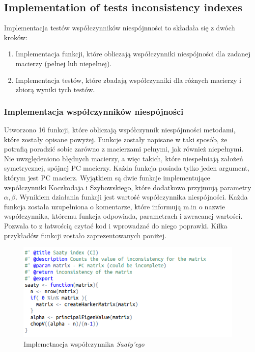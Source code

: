 \subsection{Implementation of tests inconsistency indexes}
Implementacja testów współczynników niespójnności to składała się z dwóch kroków:
\begin{enumerate}
  \item Implementacja funkcji, które obliczają współczynniki niespójności dla zadanej macierzy (pełnej lub niepełnej).
  \item Implementacja testów, które zbadają współczynniki dla różnych macierzy i zbiorą wyniki tych testów.
\end{enumerate}

\subsubsection{Implementacja współczynników niespójności}
Utworzono 16 funkcji, które obliczają współczynnik niespójnności metodami, które zostały opisane powyżej. Funkcje zostały napisane w taki sposób, że potrafią poradzić sobie zarówno z macierzami pełnymi, jak również niepełnymi. Nie uwzględeniono błędnych macierzy, a więc takich, które niespełniają założeń symetrycznej, spójnej PC macierzy. Każda funkcja posiada tylko jeden argument, którym jest PC macierz. Wyjątkiem są dwie funkcje implementujące współczynniki Koczkodaja i Szybowskiego, które dodatkowo przyjmują parametry $\alpha, \beta$. Wynikiem działania  funkcji jest wartość współczynnika niespójności.
Każda funkcja została uzupełniona o komentarze, które informują m.in o nazwie współczynnika, któremu funkcja odpowiada, parametrach i zwracanej wartości. Pozwala to z łatwością czytać kod i wprowadzać do niego poprawki.
Kilka przykładów funkcji zostało zaprezentowanych poniżej.

\begin{figure}[ht]
\centerline{\includegraphics[scale=0.75]{images/kod1.png}}
\caption{Implemetnacja współczynnika \textit{Saaty'ego}}
\label{fig:rstudio}
\end{figure}


